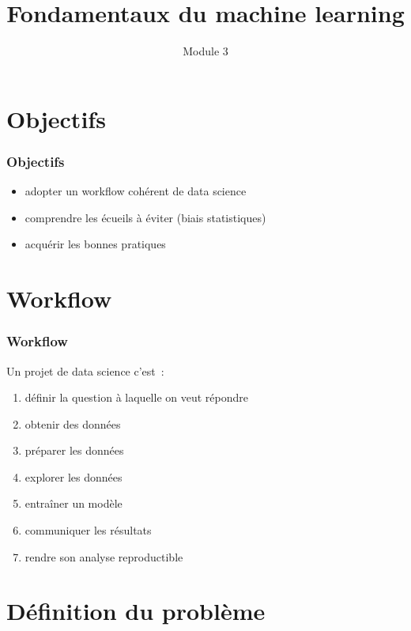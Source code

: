 \documentclass{formation}
\title{Fondamentaux du machine learning}
\subtitle{Module 3}
\begin{document}
\maketitle

\section{Objectifs}

\begin{frame}
  \frametitle{Objectifs}

  \begin{itemize}
  \item adopter un workflow cohérent de data science
  \item comprendre les écueils à éviter (biais statistiques)
  \item acquérir les bonnes pratiques
  \end{itemize}
\end{frame}

\section{Workflow}

\begin{frame}
  \frametitle{Workflow}

  Un projet de data science c'est :

  \begin{enumerate}[<+->]
  \item définir la question à laquelle on veut répondre
  \item obtenir des données
  \item préparer les données
  \item explorer les données
  \item entraîner un modèle
  \item communiquer les résultats
  \item rendre son analyse reproductible
  \end{enumerate}

\end{frame}

\section{Définition du problème}
\end{document}
